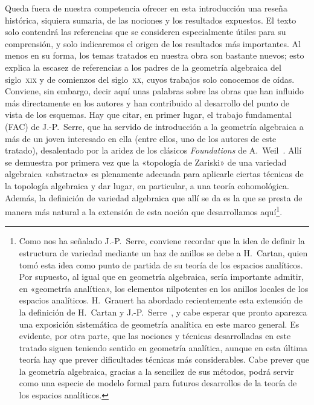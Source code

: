 Queda fuera de nuestra competencia ofrecer en esta introducción una reseña histórica, siquiera sumaria, de las nociones y los resultados expuestos.
El texto solo contendrá las referencias que se consideren especialmente útiles para su comprensión, y solo indicaremos el origen de los resultados más importantes.
Al menos en su forma, los temas tratados en nuestra obra son bastante nuevos; esto explica la escasez de referencias a los padres de la geometría algebraica del siglo~\textsc{xix} y de comienzos del siglo~\textsc{xx}, cuyos trabajos solo conocemos de oídas.
Conviene, sin embargo, decir aquí unas palabras sobre las obras que han influido más directamente en los autores y han contribuido al desarrollo del punto de vista de los esquemas.
Hay que citar, en primer lugar, el trabajo fundamental (FAC) de J.-P.~Serre, que ha servido de introducción a la geometría algebraica a más de un joven interesado en ella (entre ellos, uno de los autores de este tratado), desalentado por la aridez de los clásicos \emph{Foundations} de A.~Weil~\cite{I-18}.
Allí se demuestra por primera vez que la «topología de Zariski» de una variedad algebraica «abstracta» es plenamente adecuada para aplicarle ciertas técnicas de la topología algebraica y dar lugar, en particular, a una teoría cohomológica.
Además, la definición de variedad algebraica que allí se da es la que se presta de manera más natural a la extensión de esta noción que desarrollamos aquí\footnote{Como nos ha señalado J.-P.~Serre, conviene recordar que la idea de definir la estructura de variedad mediante un haz de anillos se debe a H.~Cartan, quien tomó esta idea como punto de partida de su teoría de los espacios analíticos.
Por supuesto, al igual que en geometría algebraica, sería importante admitir, en «geometría analítica», los elementos nilpotentes en los anillos locales de los espacios analíticos.
H.~Grauert ha abordado recientemente esta extensión de la definición de H.~Cartan y J.-P.~Serre~\cite{I-5}, y cabe esperar que pronto aparezca una exposición sistemática de geometría analítica en este marco general.
Es evidente, por otra parte, que las nociones y técnicas desarrolladas en este tratado siguen teniendo sentido en geometría analítica, aunque en esta última teoría hay que prever dificultades técnicas más considerables.
Cabe prever que la geometría algebraica, gracias a la sencillez de sus métodos, podrá servir como una especie de modelo formal para futuros desarrollos de la teoría de los espacios analíticos.}.
